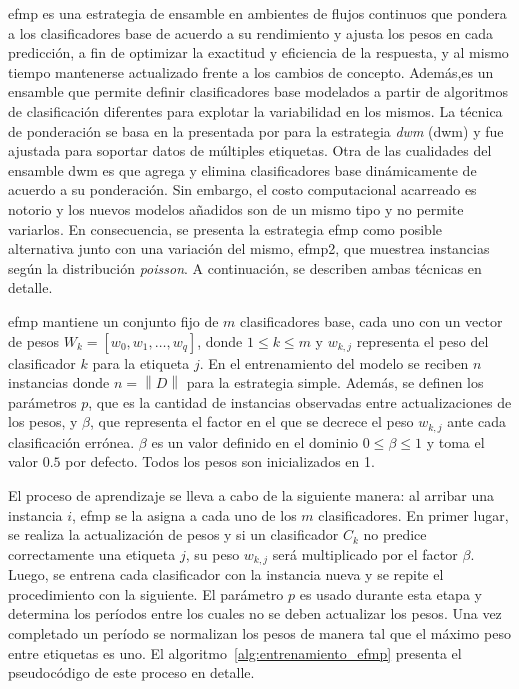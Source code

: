 \acrfull{efmp} es una estrategia de ensamble en ambientes de flujos continuos
que pondera a los clasificadores base de acuerdo a su rendimiento y ajusta los
pesos en cada predicción, a fin de optimizar la exactitud y eficiencia de la
respuesta, y al mismo tiempo mantenerse actualizado frente a los cambios de
concepto. Además,es un ensamble que permite definir clasificadores base
modelados a partir de algoritmos de clasificación diferentes para explotar la
variabilidad en los mismos. La técnica de ponderación se basa en la presentada
por \citeauthor{kolter_dynamic_2007} para la estrategia \textit{\acrlong{dwm}}
(\acrshort{dwm}) \cite{kolter_dynamic_2007} y fue ajustada para soportar datos
de múltiples etiquetas. Otra de las cualidades del ensamble \acrshort{dwm} es
que agrega y elimina clasificadores base dinámicamente de acuerdo a su
ponderación. Sin embargo, el costo computacional acarreado es notorio y los
nuevos modelos añadidos son de un mismo tipo y no permite variarlos.  En
consecuencia, se presenta la estrategia \acrshort{efmp} como posible alternativa
junto con una variación del mismo, \acrshort{efmp2}, que muestrea instancias
según la distribución \textit{poisson}. A continuación, se describen ambas
técnicas en detalle.

\acrshort{efmp} mantiene un conjunto fijo de $m$ clasificadores base, cada uno
con un vector de pesos $W_{k} = [w_{0}, w_{1}, \dots, w_{q}]$, donde $1 \leq k
	\leq m$ y $w_{k,j}$ representa el peso del clasificador $k$ para la etiqueta
$j$. En el entrenamiento del modelo se reciben $n$ instancias donde
$n=\left\|D\right\|$ para la estrategia simple. Además, se definen los parámetros
$p$, que es la cantidad de instancias observadas entre actualizaciones de los
pesos, y $\beta$, que representa el factor en el que se decrece el peso
$w_{k,j}$ ante cada clasificación errónea. $\beta$ es un valor definido en el
dominio $0 \leq \beta \leq 1$ y toma el valor $0.5$ por defecto. Todos los pesos
son inicializados en 1.

El proceso de aprendizaje se lleva a cabo de la siguiente manera: al arribar una
instancia $i$, \acrshort{efmp} se la asigna a cada uno de los $m$
clasificadores. En primer lugar, se realiza la actualización de pesos y si un
clasificador $C_{k}$ no predice correctamente una etiqueta $j$, su peso
$w_{k,j}$ será multiplicado por el factor $\beta$. Luego, se entrena cada
clasificador con la instancia nueva y se repite el procedimiento con la
siguiente. El parámetro $p$ es usado durante esta etapa y determina los períodos
entre los cuales no se deben actualizar los pesos. Una vez completado un período
se normalizan los pesos de manera tal que el máximo peso entre etiquetas es uno.
El algoritmo~\ref{alg:entrenamiento_efmp} presenta el pseudocódigo de este
proceso en detalle.

